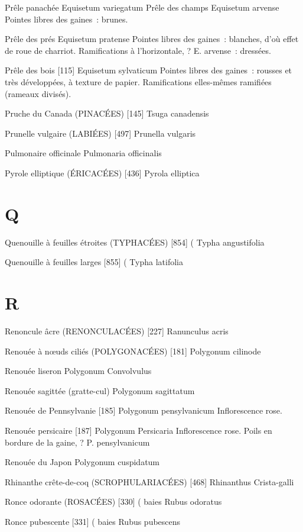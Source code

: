 \documentclass[book,12pt,a4paper,onecolumn,openany]{memoir}
\begin{document}
Prêle panachée
				Equisetum variegatum
Prêle des champs
				Equisetum arvense
Pointes libres des gaines : brunes.

Prêle des prés
				Equisetum pratense
Pointes libres des gaines : blanches, d’où effet de roue de charriot.
Ramifications à l’horizontale, ? E. arvense : dressées.

Prêle des bois  [115]
				Equisetum sylvaticum
Pointes libres des gaines : rousses et très développées, à texture de papier.
Ramifications elles-mêmes ramifiées (rameaux divisés).

Pruche du Canada (PINACÉES)  [145]
				Tsuga canadensis

Prunelle vulgaire (LABIÉES)  [497]
				Prunella vulgaris

Pulmonaire officinale
				Pulmonaria officinalis

Pyrole elliptique (ÉRICACÉES)  [436]
				Pyrola elliptica
\chapter*{Q}

Quenouille à feuilles étroites (TYPHACÉES)  [854]		(
				Typha angustifolia

Quenouille à feuilles larges  [855]					(
				Typha latifolia

\chapter*{R}

Renoncule âcre (RENONCULACÉES)  [227]
				Ranunculus acris

Renouée à nœuds ciliés (POLYGONACÉES)  [181]
				Polygonum cilinode

Renouée liseron
				Polygonum Convolvulus

Renouée sagittée (gratte-cul)
				Polygonum sagittatum


Renouée de Pennsylvanie  [185]
				Polygonum pensylvanicum
Inflorescence rose.

Renouée persicaire  [187]
				Polygonum Persicaria
Inflorescence rose. Poils en bordure de la gaine, ? P. pensylvanicum

Renouée du Japon
				Polygonum cuspidatum

Rhinanthe crête-de-coq (SCROPHULARIACÉES)  [468]
				Rhinanthus Crista-galli

Ronce odorante (ROSACÉES)  [330]			( baies
				Rubus odoratus

Ronce pubescente  [331]					( baies
				Rubus pubescens
\end{document}
